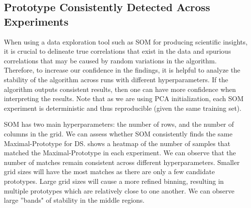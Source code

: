 

\subsection*{Prototype Consistently Detected Across Experiments}

When using a data exploration tool such as SOM for producing scientific insights, it is crucial to delineate true correlations that exist in the data and spurious correlations that may be caused by random variations in the algorithm. Therefore, to increase our confidence in the findings, it is helpful to analyze the stability of the algorithm across runs with different hyperparameters. If the algorithm outputs consistent results, then one can have more confidence when interpreting the results. Note that as we are using PCA initialization, each SOM experiment is deterministic and thus reproducible (given the same training set).

SOM has two main hyperparameters: the number of rows, and the number of columns in the grid. We can assess whether SOM consistently finds the same Maximal-Prototype for DS. 
 shows a heatmap of the number of samples that matched the Maximal-Prototype in each experiment. We can observe that the number of matches remain consistent across different hyperparameters. Smaller grid sizes will have the most matches as there are only a few candidate prototypes. Large grid sizes will cause a more refined binning, resulting in multiple prototypes which are relatively close to one another. We can observe large ''bands" of stability in the middle regions.

